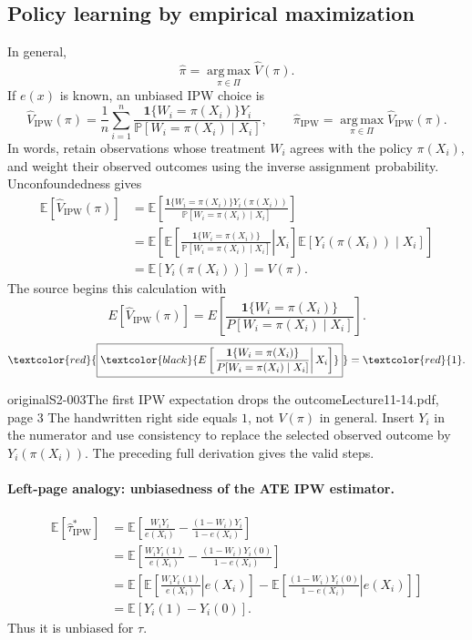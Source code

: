 \subsection{Policy learning by empirical maximization}
In general,
\[
 \widehat\pi=\operatorname*{arg\,max}_{\pi\in\Pi}\widehat V(\pi).
\]
If $e(x)$ is known, an unbiased IPW choice is
\[
 \widehat V_{\mathrm{IPW}}(\pi)
 =\frac1n\sum_{i=1}^n
 \frac{\mathbf1\{W_i=\pi(X_i)\}Y_i}
 {\mathbb P[W_i=\pi(X_i)\mid X_i]},
 \qquad
 \widehat\pi_{\mathrm{IPW}}
 =\operatorname*{arg\,max}_{\pi\in\Pi}\widehat V_{\mathrm{IPW}}(\pi).
\]
In words, retain observations whose treatment $W_i$ agrees with the policy $\pi(X_i)$, and weight their observed outcomes using the inverse assignment probability. Unconfoundedness gives
\begin{align*}
 \mathbb E[\widehat V_{\mathrm{IPW}}(\pi)]
 &=\mathbb E\left[
 \frac{\mathbf1\{W_i=\pi(X_i)\}Y_i(\pi(X_i))}
 {\mathbb P[W_i=\pi(X_i)\mid X_i]}\right]\\
 &=\mathbb E\left[
 \mathbb E\left[\left.
 \frac{\mathbf1\{W_i=\pi(X_i)\}}
 {\mathbb P[W_i=\pi(X_i)\mid X_i]}\right|X_i\right]
 \mathbb E[Y_i(\pi(X_i))\mid X_i]\right]\\
 &=\mathbb E[Y_i(\pi(X_i))]=V(\pi).
\end{align*}
The source begins this calculation with
\[
 E[\widehat V_{\mathrm{IPW}}(\pi)]
 =E\left[\frac{\mathbf1\{W_i=\pi(X_i)\}}{P[W_i=\pi(X_i)\mid X_i]}\right].
\]
\[
 \textcolor{red}{\boxed{\textcolor{black}{E\left[\left.
 \frac{\mathbf1\{W_i=\pi(X_i)\}}{P[W_i=\pi(X_i)\mid X_i]}
 \right|X_i\right]}}}=\textcolor{red}{1}.
\]


\begin{reviewnote}{original}{S2-003}{The first IPW expectation drops the outcome}{Lecture11-14.pdf, page 3}
The handwritten right side equals $1$, not $V(\pi)$ in general. Insert $Y_i$ in the numerator and use consistency to replace the selected observed outcome by $Y_i(\pi(X_i))$. The preceding full derivation gives the valid steps.
\end{reviewnote}


\paragraph{Left-page analogy: unbiasedness of the ATE IPW estimator.}
\begin{align*}
 \mathbb E[\widehat\tau^*_{\mathrm{IPW}}]
 &=\mathbb E\left[\frac{W_iY_i}{e(X_i)}-
 \frac{(1-W_i)Y_i}{1-e(X_i)}\right]\\
 &=\mathbb E\left[\frac{W_iY_i(1)}{e(X_i)}-
 \frac{(1-W_i)Y_i(0)}{1-e(X_i)}\right]\\
 &=\mathbb E\left[
 \mathbb E\left[\left.\frac{W_iY_i(1)}{e(X_i)}\right|e(X_i)\right]
 -\mathbb E\left[\left.\frac{(1-W_i)Y_i(0)}{1-e(X_i)}\right|e(X_i)\right]
 \right]\\
 &=\mathbb E[Y_i(1)-Y_i(0)].
\end{align*}
Thus it is unbiased for $\tau$.

